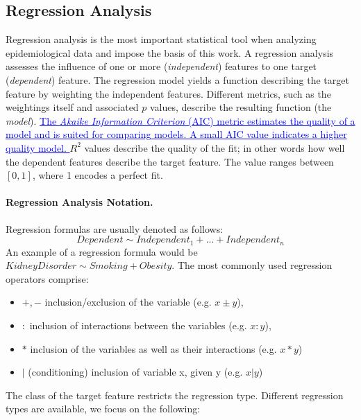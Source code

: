 \documentclass[journal]{style/vgtc} 			          %
\newcommand{\add}[1]{\textcolor{blue}{\uline{#1}}}
\begin{document}
\subsection{Regression Analysis} \label{sec:RegressionAnalysis}
Regression analysis is the most important statistical tool when analyzing epidemiological data and impose the basis of this work.
A regression analysis assesses the influence of one or more (\emph{independent}) features to one target (\emph{dependent}) feature.
The regression model yields a function describing the target feature by weighting the independent features.
Different metrics, such as the weightings itself and associated $p$ values, describe the resulting function (the \emph{model}).
\add{
The \emph{Akaike Information Criterion} (AIC) metric estimates the quality of a model and is suited for comparing models.
A small AIC value indicates a higher quality model.
}
$R^2$ values describe the quality of the fit; in other words how well the dependent features describe the target feature.
The value ranges between $[0, 1]$, where 1 encodes a perfect fit.

\paragraph{Regression Analysis Notation.} Regression formulas are usually denoted as follows:
\begin{equation}
Dependent \sim Independent_1 + ... + Independent_n
\label{eq:RegressionNotation}
\end{equation}
An example of a regression formula would be $KidneyDisorder \sim Smoking + Obesity$.
The most commonly used regression operators comprise:
\begin{itemize}
	\item $+,-$ inclusion/exclusion of the variable (e.g. $x\pm y$),
	\item $:$ inclusion of interactions between the variables (e.g. $x:y$),
	\item $*$ inclusion of the variables as well as their interactions (e.g. $x*y$)
	\item $|$ (conditioning) inclusion of variable x, given y (e.g. $x|y$)
\end{itemize}
The class of the target feature restricts the regression type.
Different regression types are available, we focus on the following:
\end{document}

